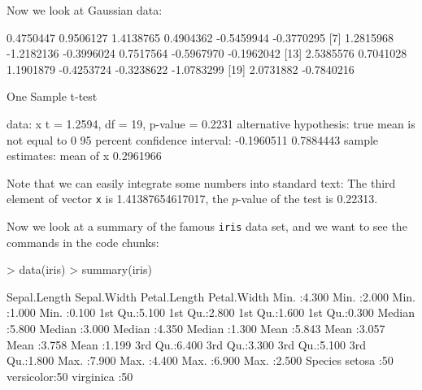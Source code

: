\documentclass[a4paper]{article}
\begin{document}
Now we look at Gaussian data:

\begin{Schunk}
\begin{Soutput}
 [1]  0.4750447  0.9506127  1.4138765  0.4904362 -0.5459944 -0.3770295
 [7]  1.2815968 -1.2182136 -0.3996024  0.7517564 -0.5967970 -0.1962042
[13]  2.5385576  0.7041028  1.1901879 -0.4253724 -0.3238622 -1.0783299
[19]  2.0731882 -0.7840216
\end{Soutput}
\begin{Soutput}
	One Sample t-test

data:  x 
t = 1.2594, df = 19, p-value = 0.2231
alternative hypothesis: true mean is not equal to 0 
95 percent confidence interval:
 -0.1960511  0.7884443 
sample estimates:
mean of x 
0.2961966 
\end{Soutput}
\end{Schunk}
Note that we can easily integrate some numbers into standard text: The
third element of vector \texttt{x} is 1.41387654617017, the
$p$-value of the test is 0.22313. %

Now we look at a summary of the famous \texttt{iris} data set, and we
want to see the commands in the code chunks:



\begin{Schunk}
\begin{Sinput}
> data(iris)
> summary(iris)
\end{Sinput}
\begin{Soutput}
  Sepal.Length    Sepal.Width     Petal.Length    Petal.Width   
 Min.   :4.300   Min.   :2.000   Min.   :1.000   Min.   :0.100  
 1st Qu.:5.100   1st Qu.:2.800   1st Qu.:1.600   1st Qu.:0.300  
 Median :5.800   Median :3.000   Median :4.350   Median :1.300  
 Mean   :5.843   Mean   :3.057   Mean   :3.758   Mean   :1.199  
 3rd Qu.:6.400   3rd Qu.:3.300   3rd Qu.:5.100   3rd Qu.:1.800  
 Max.   :7.900   Max.   :4.400   Max.   :6.900   Max.   :2.500  
       Species  
 setosa    :50  
 versicolor:50  
 virginica :50  
\end{Soutput}
\end{Schunk}
\end{document}
